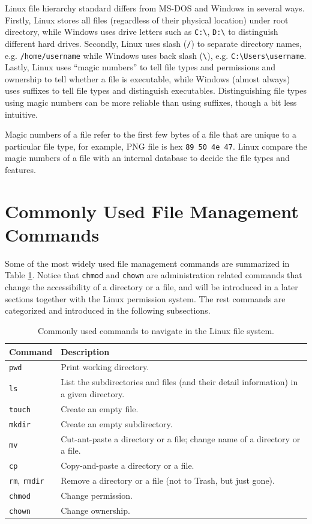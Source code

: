 Linux file hierarchy standard differs from MS-DOS and Windows in several ways. Firstly, Linux stores all files (regardless of their physical location) under root directory, while Windows uses drive letters such as \verb|C:\|, \verb|D:\| to distinguish different hard drives. Secondly, Linux uses slash (\verb|/|) to separate directory names, e.g. \verb|/home/username| while Windows uses back slash (\verb|\|), e.g. \verb|C:\Users\username|. Lastly, Linux uses ``magic numbers'' to tell file types and permissions and ownership to tell whether a file is executable, while Windows (almost always) uses suffixes to tell file types and distinguish executables. Distinguishing file types using magic numbers can be more reliable than using suffixes, though a bit less intuitive.

Magic numbers of a file refer to the first few bytes of a file that are unique to a particular file type, for example, PNG file is hex \verb|89 50 4e 47|. Linux compare the magic numbers of a file with an internal database to decide the file types and features.

\section{Commonly Used File Management Commands} \label{ch4sec:filemanagement}

Some of the most widely used file management commands are summarized in Table \ref{ch4tab:commonfilecommands}. Notice that \verb|chmod| and \verb|chown| are administration related commands that change the accessibility of a directory or a file, and will be introduced in a later sections together with the Linux permission system. The rest commands are categorized and introduced in the following subsections.

\begin{table}
  \centering \caption{Commonly used commands to navigate in the Linux file system.}\label{ch4tab:commonfilecommands}
  \begin{tabularx}{\textwidth}{lX}
    \hline
    Command & Description \\ \hline
    \verb|pwd| & Print working directory. \\ \hdashline
    \verb|ls| & List the subdirectories and files (and their detail information) in a given directory. \\ \hdashline
    \verb|touch| & Create an empty file. \\ \hdashline
    \verb|mkdir| & Create an empty subdirectory. \\ \hdashline
    \verb|mv| & Cut-ant-paste a directory or a file; change name of a directory or a file. \\ \hdashline
    \verb|cp| & Copy-and-paste a directory or a file. \\ \hdashline
    \verb|rm|, \verb|rmdir| & Remove a directory or a file (not to Trash, but just gone). \\ \hdashline
    \verb|chmod| & Change permission. \\ \hdashline
    \verb|chown| & Change ownership. \\
    \hline
  \end{tabularx}
\end{table}

